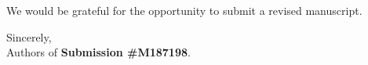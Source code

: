 \documentclass[11pt]{article}
\begin{document}
We would be grateful for the opportunity to submit a revised manuscript. 

\vspace{1.5em}

\noindent Sincerely,\\
Authors of \textbf{Submission \#M187198}.








\end{document}
